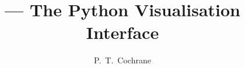 
\title{\Huge \pyvisi --- {\Large The Python Visualisation Interface}}


\author{P.~T.~Cochrane}

\maketitle
